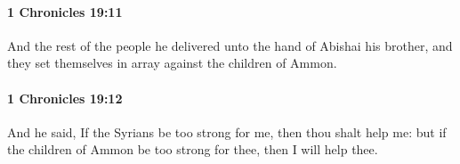 		\paragraph{1 Chronicles 19:11} %
			\label{1CHRONICLES-19-11}

			And the rest of the people he delivered unto the hand of Abishai his brother, and they set themselves in array against the children of Ammon.


		\paragraph{1 Chronicles 19:12} %
			\label{1CHRONICLES-19-12}

			And he said, If the Syrians be too strong for me, then thou shalt help me: but if the children of Ammon be too strong for thee, then I will help thee.


